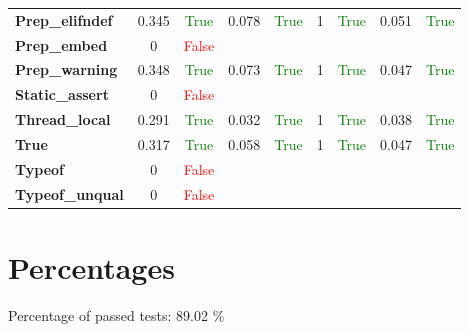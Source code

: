 \documentclass{article}
\begin{document}
\begin{xltabular}{\textwidth}{lcc}
\textbf{Prep\_elifndef}& 0.345&\textcolor{green}{True}& 0.078&\textcolor{green}{True}& 1&\textcolor{green}{True}& 0.051&\textcolor{green}{True} \\[0.5ex]
\textbf{Prep\_embed}& 0&\textcolor{red}{False} \\[0.5ex]
\textbf{Prep\_warning}& 0.348&\textcolor{green}{True}& 0.073&\textcolor{green}{True}& 1&\textcolor{green}{True}& 0.047&\textcolor{green}{True} \\[0.5ex]
\textbf{Static\_assert}& 0&\textcolor{red}{False} \\[0.5ex]
\textbf{Thread\_local}& 0.291&\textcolor{green}{True}& 0.032&\textcolor{green}{True}& 1&\textcolor{green}{True}& 0.038&\textcolor{green}{True} \\[0.5ex]
\textbf{True}& 0.317&\textcolor{green}{True}& 0.058&\textcolor{green}{True}& 1&\textcolor{green}{True}& 0.047&\textcolor{green}{True} \\[0.5ex]
\textbf{Typeof}& 0&\textcolor{red}{False} \\[0.5ex]
\textbf{Typeof\_unqual}& 0&\textcolor{red}{False} \\[0.5ex]
\bottomrule
\end{xltabular}
\newpage
\section{Percentages}Percentage of passed tests:
89.02 \%\end{document}
\end{document}
